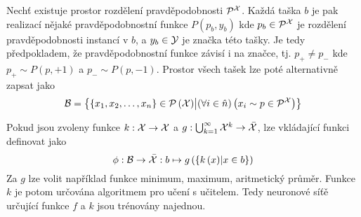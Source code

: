 Nechť existuje prostor rozdělení pravděpodobnosti \( \mathcal P^{\mathcal X} \). Každá taška \( b \) je pak realizací nějaké pravděpodobnostní funkce \( P \left( p_b, y_b \right) \) kde \( p_b \in \mathcal P^{\mathcal X} \) je rozdělení pravděpodobnosti instancí v \( b \), a \( y_b \in \mathcal Y \) je značka této tašky. Je tedy předpokladem, že pravděpodobnostní funkce závisí i na značce, tj. \( p_+ \neq p_- \) kde \( p_+ \sim P(p, +1) \) a \( p_- \sim P(p, -1) \). Prostor všech tašek lze poté alternativně zapsat jako
\begin{equation}
	\mathcal B = \left\{ \left\{ x_1, x_2, \dots, x_n \right\} \in \mathcal P \left( \mathcal X \right) \middle| \left( \forall i \in \hat n \right) \left( x_i \sim p \in \mathcal P^{\mathcal X} \right) \right\}
\end{equation}

Pokud jsou zvoleny funkce \( k : \mathcal X \to \mathcal X \) a \( g : \bigcup_{k = 1}^{\infty} \mathcal X^k \to \bar{\mathcal X} \), lze vkládající funkci definovat jako
\begin{equation}\label{net_pooling}
	\phi : \mathcal B \to \bar{\mathcal X} : b \mapsto g \left( \left\{ k \left( x \right) \middle| x \in b \right\} \right)
\end{equation}
Za \( g \) lze volit například funkce minimum, maximum, aritmetický průměr. Funkce \( k \) je potom určována algoritmem pro učení s učitelem. Tedy neuronové síťě určující funkce \( f \) a \( k \) jsou trénovány najednou.
